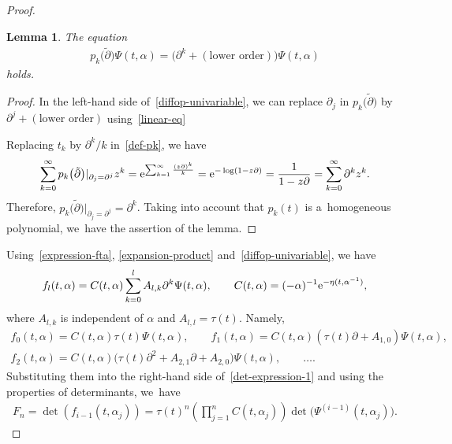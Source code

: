 \documentclass[10pt,a4paper]{amsart}
\numberwithin{equation}{section}
\newtheorem{Lemma}[Theorem]{Lemma}
\theoremstyle{definition}
\begin{document}
\begin{proof}
\begin{Lemma}
The equation
\begin{gather}
p_k\bigl(\tilde{\partial}\bigr)\Psi(t,\alpha)=
\bigl( \partial^k+(\text{lower order}) \bigr) \Psi(t,\alpha)
\label{diffop-univariable}
\end{gather}
holds.
\end{Lemma}

\begin{proof}
In the left-hand side of~\eqref{diffop-univariable},
 we can replace $\partial_j$ in $p_k\bigl(\tilde{\partial}\bigr)$ by
$\partial^j+(\text{lower order})$ using~\eqref{linear-eq}

Replacing $t_k$ by $\partial^k/k$ in~\eqref{def-pk}, we have
\begin{gather*}
\sum_{k=0}^\infty p_k\bigl(\tilde{\partial}\bigr)|_{\partial_j=\partial^j}z^k
=
{\rm e}^{\sum_{k=1}^\infty \frac{(z\partial)^k}{k}}
=
{\rm e}^{-\log(1-z\partial)}
=
\frac{1}{1-z\partial}
=
\sum_{k=0}^\infty \partial^k z^k.
\end{gather*}
Therefore, $
p_k\bigl(\tilde{\partial}\bigr)|_{\partial_j=\partial^j}=\partial^k$.
Taking into account that $p_k(t)$ is a~homogeneous polynomial, we~have the assertion
of the lemma.
\end{proof}

Using~\eqref{expression-fta}, \eqref{expansion-product} and~\eqref{diffop-univariable}, we have
\begin{gather}
f_l(t,\alpha)
=
C(t,\alpha)
\sum_{k=0}^lA_{l,k}\partial^k\Psi(t,\alpha),
\qquad
C(t,\alpha)=(-\alpha)^{-1} {\rm e}^{-\eta(t,\alpha^{-1})},
\label{fl}
\end{gather}
where $A_{l,k}$ is independent of $\alpha$ and $A_{l,l}=\tau(t)$. Namely,
\begin{gather*}
f_0(t,\alpha)=C(t,\alpha)\tau(t)\Psi(t,\alpha),
\qquad
f_1(t,\alpha)=C(t,\alpha)(\tau(t)\partial+A_{1,0})\Psi(t,\alpha),
\\
f_2(t,\alpha)=C(t,\alpha)\big(\tau(t)\partial^2+A_{2,1}\partial+A_{2,0}\big)\Psi(t,\alpha),
\qquad
\dots.
\end{gather*}
Substituting them into the right-hand side of~\eqref{det-expression-1} and using
the properties of determinants, we~have
\begin{gather}
F_n=\det(f_{i-1}(t,\alpha_j))=\tau(t)^n
\left(\prod_{j=1}^nC(t,\alpha_j)\right)
\det\bigl(\Psi^{(i-1)}(t,\alpha_j)\bigr).
\label{expression-Fn}
\end{gather}


\end{proof}
\end{document}
